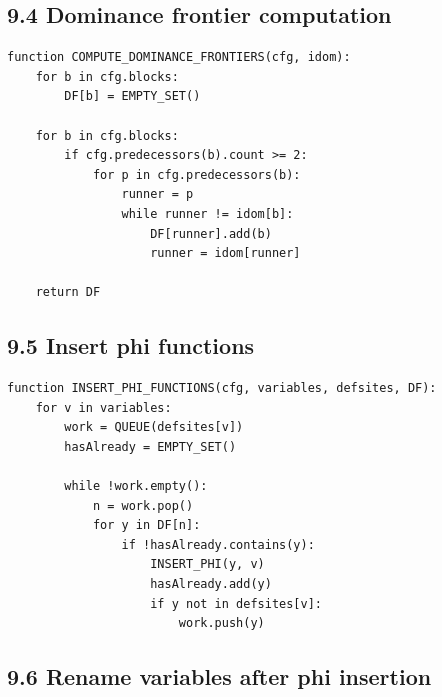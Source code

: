 \documentclass[10pt,letterpaper]{article}
\begin{document}
\subsection*{9.4 Dominance frontier computation}
{}

\begin{verbatim}
function COMPUTE_DOMINANCE_FRONTIERS(cfg, idom):
    for b in cfg.blocks:
        DF[b] = EMPTY_SET()

    for b in cfg.blocks:
        if cfg.predecessors(b).count >= 2:
            for p in cfg.predecessors(b):
                runner = p
                while runner != idom[b]:
                    DF[runner].add(b)
                    runner = idom[runner]

    return DF
\end{verbatim}

\subsection*{9.5 Insert phi functions}
{}

\begin{verbatim}
function INSERT_PHI_FUNCTIONS(cfg, variables, defsites, DF):
    for v in variables:
        work = QUEUE(defsites[v])
        hasAlready = EMPTY_SET()

        while !work.empty():
            n = work.pop()
            for y in DF[n]:
                if !hasAlready.contains(y):
                    INSERT_PHI(y, v)
                    hasAlready.add(y)
                    if y not in defsites[v]:
                        work.push(y)
\end{verbatim}

\subsection*{9.6 Rename variables after phi insertion}
{}
\end{document}
